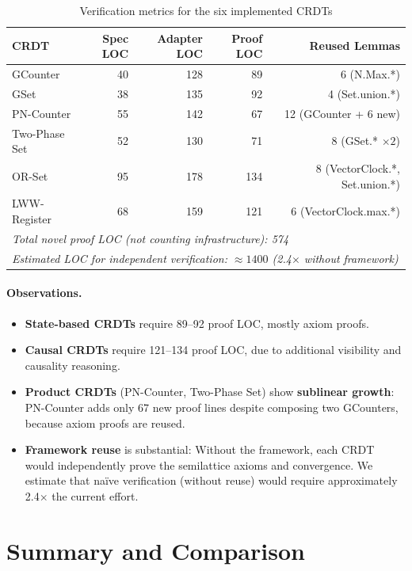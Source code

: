 \begin{table}[t]
  \centering
  \caption{Verification metrics for the six implemented CRDTs}
  \label{tab:crdt-metrics}
  \small
  \begin{tabular}{lrrrr}
    \toprule
    \textbf{CRDT} & \textbf{Spec LOC} & \textbf{Adapter LOC} & \textbf{Proof LOC} & \textbf{Reused Lemmas}\\
    \midrule
    GCounter & 40 & 128 & 89 & 6 (N.Max.*)\\
    GSet & 38 & 135 & 92 & 4 (Set.union.*)\\
    PN-Counter & 55 & 142 & 67 & 12 (GCounter + 6 new)\\
    Two-Phase Set & 52 & 130 & 71 & 8 (GSet.* $\times 2$)\\
    OR-Set & 95 & 178 & 134 & 8 (VectorClock.*, Set.union.*)\\
    LWW-Register & 68 & 159 & 121 & 6 (VectorClock.max.*)\\
    \bottomrule
    \multicolumn{5}{l}{\small \textit{Total novel proof LOC (not counting infrastructure): 574}}\\
    \multicolumn{5}{l}{\small \textit{Estimated LOC for independent verification: $\approx 1400$ (2.4$\times$ without framework)}}
  \end{tabular}
\end{table}

\paragraph{Observations.}
\begin{itemize}
  \item \textbf{State-based CRDTs} require 89--92 proof LOC, mostly axiom proofs.
  \item \textbf{Causal CRDTs} require 121--134 proof LOC, due to additional visibility and causality reasoning.
  \item \textbf{Product CRDTs} (PN-Counter, Two-Phase Set) show \textbf{sublinear growth}: PN-Counter adds only 67 new proof lines despite composing two GCounters, because axiom proofs are reused.
  \item \textbf{Framework reuse} is substantial: Without the framework, each CRDT would independently prove the semilattice axioms and convergence. We estimate that naïve verification (without reuse) would require approximately 2.4$\times$ the current effort.
\end{itemize}

\section{Summary and Comparison}

